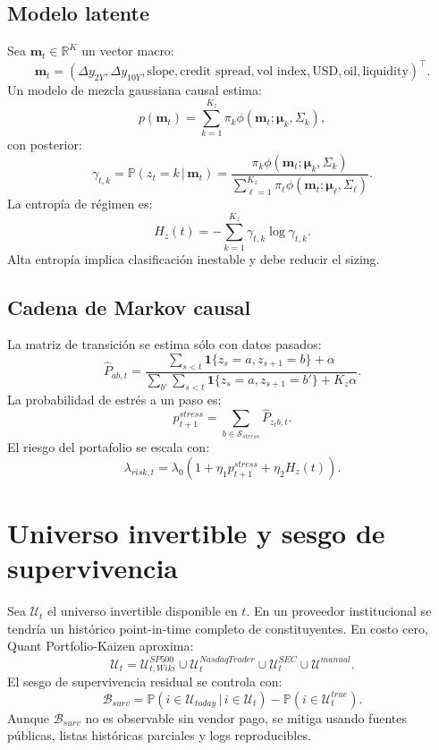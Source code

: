 \documentclass[11pt,letterpaper]{article}
\newcommand{\R}{\mathbb{R}}
\newcommand{\Prob}{\mathbb{P}}
\newcommand{\1}{\mathbf{1}}
\newcommand{\given}{\,|\,}
\begin{document}
\subsection{Modelo latente}

Sea \(\bm m_t\in\R^K\) un vector macro:
\[
    \bm m_t =
    (\Delta y_{2Y},\Delta y_{10Y}, \text{slope}, \text{credit spread},
    \text{vol index}, \text{USD}, \text{oil}, \text{liquidity})^\top.
\]
Un modelo de mezcla gaussiana causal estima:
\[
    p(\bm m_t)
    =
    \sum_{k=1}^{K_z}
    \pi_k
    \phi(\bm m_t;\bm\mu_k,\Sigma_k),
\]
con posterior:
\[
    \gamma_{t,k}
    =
    \Prob(z_t=k\given \bm m_t)
    =
    \frac{\pi_k\phi(\bm m_t;\bm\mu_k,\Sigma_k)}
    {\sum_{\ell=1}^{K_z}\pi_\ell\phi(\bm m_t;\bm\mu_\ell,\Sigma_\ell)}.
\]
La entropía de régimen es:
\[
    H_z(t)
    =
    -\sum_{k=1}^{K_z}\gamma_{t,k}\log \gamma_{t,k}.
\]
Alta entropía implica clasificación inestable y debe reducir el sizing.

\subsection{Cadena de Markov causal}

La matriz de transición se estima sólo con datos pasados:
\[
    \hat P_{ab,t}
    =
    \frac{\sum_{s<t}\1\{z_s=a,z_{s+1}=b\}+\alpha}
    {\sum_{b'}\sum_{s<t}\1\{z_s=a,z_{s+1}=b'\}+K_z\alpha}.
\]
La probabilidad de estrés a un paso es:
\[
    p^{stress}_{t+1}
    =
    \sum_{b\in \mathcal{S}_{stress}}
    \hat P_{z_t b,t}.
\]
El riesgo del portafolio se escala con:
\[
    \lambda_{risk,t}
    =
    \lambda_0
    \left(1+\eta_1 p^{stress}_{t+1}+\eta_2 H_z(t)\right).
\]

\newpage
\section{Universo invertible y sesgo de supervivencia}

Sea \(\mathcal{U}_t\) el universo invertible disponible en \(t\). En un proveedor institucional se tendría un histórico point-in-time completo de constituyentes. En costo cero, Quant Portfolio-Kaizen aproxima:
\[
    \mathcal{U}_t =
    \mathcal{U}^{SP500}_{t,Wiki}
    \cup
    \mathcal{U}^{NasdaqTrader}_t
    \cup
    \mathcal{U}^{SEC}_t
    \cup
    \mathcal{U}^{manual}.
\]
El sesgo de supervivencia residual se controla con:
\[
    \mathcal{B}_{surv}
    =
    \Prob(i\in\mathcal{U}_{today}\given i\in\mathcal{U}_t)
    -
    \Prob(i\in\mathcal{U}^{true}_t).
\]
Aunque \(\mathcal{B}_{surv}\) no es observable sin vendor pago, se mitiga usando fuentes públicas, listas históricas parciales y logs reproducibles.
\end{document}
